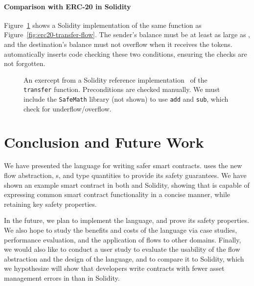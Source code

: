 \documentclass[dvipsnames,runningheads]{llncs}
\begin{document}
\paragraph{Comparison with ERC-20 in Solidity}\label{sec:erc20-impl}
Figure~\ref{fig:erc20-transfer-sol} shows a Solidity implementation of the same function as Figure~\ref{fig:erc20-transfer-flow}.
The sender's balance must be at least as large as , and the destination's balance must not overflow when it receives the tokens.
\langName automatically inserts code checking these two conditions, ensuring the checks are not forgotten.
\begin{figure}
    \vspace{-2em}
    \centering
    
    \vspace{-1em}
    \caption{An exercept from a Solidity reference implementation~\cite{erc20Consensys} of the \lstinline[language=Solidity]{transfer} function.
        Preconditions are checked manually.
        We must include the \lstinline[language=Solidity]{SafeMath} library (not shown) to use \lstinline[language=Solidity]{add} and \lstinline[language=Solidity]{sub}, which check for underflow/overflow.}
    \label{fig:erc20-transfer-sol}
    \vspace{-2em}
\end{figure}

\section{Conclusion and Future Work}

We have presented the \langName language for writing safer smart contracts.
\langName uses the new flow abstraction, \assetTxt{}s, and type quantities to provide its safety guarantees.
We have shown an example smart contract in both \langName and Solidity, showing that \langName is capable of expressing common smart contract functionality in a concise manner, while retaining key safety properties.

In the future, we plan to implement the \langName language, and prove its safety properties.
We also hope to study the benefits and costs of the language via case studies, performance evaluation, and the application of flows to other domains.
Finally, we would also like to conduct a user study to evaluate the usability of the flow abstraction and the design of the language, and to compare it to Solidity, which we hypothesize will show that developers write contracts with fewer asset management errors in \langName than in Solidity.



\end{document}
